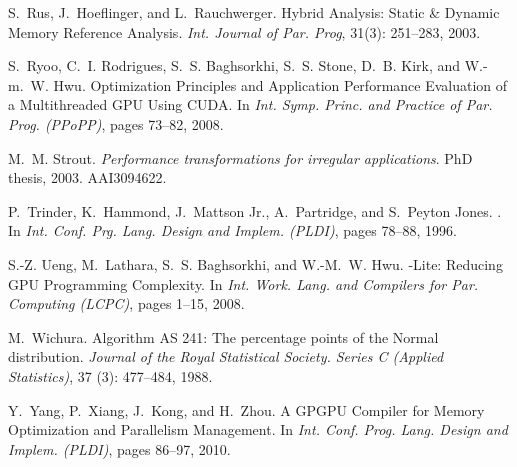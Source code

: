 \documentclass{sigplanconf}  %
\begin{document}
\begin{thebibliography}{49}
S.~Rus, J.~Hoeflinger, and L.~Rauchwerger.
\newblock Hybrid {A}nalysis: {S}tatic \& {D}ynamic {M}emory {R}eference
  {A}nalysis.
\newblock \emph{Int. Journal of Par. Prog}, 31(3): 251--283, 2003.

S.~Ryoo, C.~I. Rodrigues, S.~S. Baghsorkhi, S.~S. Stone, D.~B. Kirk, and
  W.-m.~W. Hwu.
\newblock Optimization {P}rinciples and {A}pplication {P}erformance
  {E}valuation of a {M}ultithreaded {GPU} {U}sing {CUDA}.
\newblock In \emph{Int. Symp. Princ. and Practice of Par. Prog. (PPoPP)}, pages
  73--82, 2008.

M.~M. Strout.
\newblock \emph{Performance transformations for irregular applications}.
\newblock PhD thesis, 2003.
\newblock AAI3094622.

P.~Trinder, K.~Hammond, J.~{Mattson Jr.}, A.~Partridge, and S.~{Peyton Jones}.
.
\newblock In \emph{Int. Conf. Prg. Lang. Design and Implem. (PLDI)}, pages
  78--88, 1996.

S.-Z. Ueng, M.~Lathara, S.~S. Baghsorkhi, and W.-M.~W. Hwu.
-{L}ite: {R}educing {GPU} {P}rogramming {C}omplexity.
\newblock In \emph{Int. Work. Lang. and Compilers for Par. Computing (LCPC)},
  pages 1--15, 2008.

M.~Wichura.
\newblock Algorithm {AS} 241: {T}he percentage points of the {N}ormal
  distribution.
\newblock \emph{Journal of the Royal Statistical Society. Series C (Applied
  Statistics)}, 37 (3): 477--484, 1988.

Y.~Yang, P.~Xiang, J.~Kong, and H.~Zhou.
\newblock A {GPGPU} {C}ompiler for {M}emory {O}ptimization and {P}arallelism
  {M}anagement.
\newblock In \emph{Int. Conf. Prog. Lang. Design and Implem. (PLDI)}, pages
  86--97, 2010.

\end{thebibliography}
\end{document}
